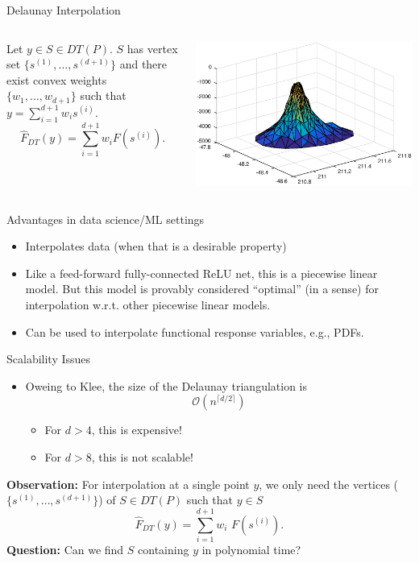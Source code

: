 \documentclass[aspectratio=169]{beamer}
\begin{document}
\begin{frame}{Delaunay Interpolation}
\begin{columns}
\begin{column}{.58\textwidth}
Let $y \in S \in DT(P)$.
$S$ has vertex set $\{s^{(1)}, \ldots, s^{(d+1)}\}$ and there exist
convex weights $\{w_1, \ldots, w_{d+1}\}$ such that
$y = \sum_{i=1}^{d+1} w_i s^{(i)}$.
$$
{\hat F}_{DT}(y) = \sum_{i=1}^{d+1} w_i F(s^{(i)}).
$$
\end{column}
\begin{column}{.38\textwidth}
\hbox{\includegraphics[width=\textwidth]{seamount.eps}}
\end{column}
\end{columns}
\medskip
Advantages in data science/ML settings
\begin{itemize}
\item Interpolates data (when that is a desirable property)
\item Like a feed-forward fully-connected ReLU net, this is a piecewise linear
model.
But this model is provably considered ``optimal'' (in a sense) for
interpolation w.r.t. other piecewise linear models.
\item Can be used to interpolate functional response variables, e.g., PDFs.
\end{itemize}
\end{frame}
\begin{frame}{Scalability Issues}
\begin{itemize}
\item Oweing to Klee, the size of the Delaunay triangulation is
$$
\mathcal{O}\left(n^{\lceil d/2 \rceil}\right)
$$
\begin{itemize}
\item For $d > 4$, this is expensive!
\item For $d > 8$, this is not scalable!
\end{itemize}
\end{itemize}
\pause
{\textbf{Observation:}
For interpolation at a single point $y$, we only need the
vertices ($\{s^{(1)}, \ldots, s^{(d+1)}\}$) of $S \in DT(P)$
such that $y\in S$}
$$
{\hat F}_{DT}(y) = \sum_{i=1}^{d+1} w_i\text{~}F(s^{(i)}).
$$
\medskip
\pause
{\textbf{Question:} Can we find $S$ containing $y$ in polynomial time?}
\end{frame}
\end{document}
